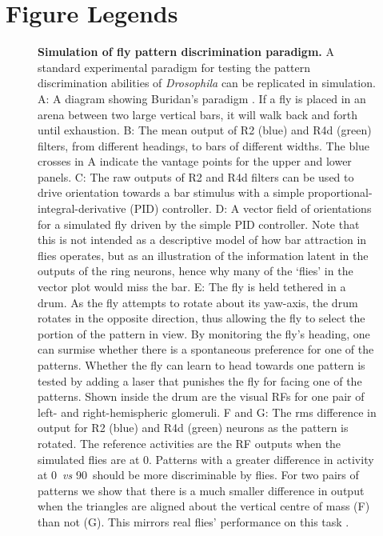 \documentclass[10pt]{article}
\begin{document}
\section*{Figure Legends}
%
\begin{figure}
	\caption{
		{\bf Simulation of fly pattern discrimination paradigm.}
		A standard experimental paradigm for testing the pattern discrimination abilities of \emph{Drosophila} \cite{Ernst1999} can be replicated in simulation.
		A: A diagram showing Buridan's paradigm \protect\cite{Gotz1980,Bulthoff1982}. If a fly is placed in an arena between two large vertical bars, it will walk back and forth until exhaustion.
		B: The mean output of R2 (blue) and R4d (green) filters, from different headings, to bars of different widths. The blue crosses in A indicate the vantage points for the upper and lower panels.
		C: The raw outputs of R2 and R4d filters can be used to drive orientation towards a bar stimulus with a simple
		proportional-integral-derivative (PID) controller.
		D: A vector field of orientations for a simulated fly driven by the simple PID controller.
		Note that this is not intended as a descriptive model of how bar attraction in flies operates, but as an illustration of the information latent in the outputs of the ring neurons, hence why many of the `flies' in the vector plot would miss the bar.
		E: The fly is held tethered in a drum. As the fly attempts to rotate about its yaw-axis, the drum rotates in the opposite direction, thus allowing the fly to select the portion of the pattern in view.
		By monitoring the fly's heading, one can surmise whether there is a spontaneous preference for one of the patterns.
		Whether the fly can learn to head towards one pattern is tested by adding a laser that punishes the fly for facing one of the patterns.
		Shown inside the drum are the visual \acp{RF} for one pair of left- and right-hemispheric glomeruli.
		F and G: The \ac{rms} difference in output for R2 (blue) and R4d (green) neurons as the pattern is rotated.
		The reference activities are the \ac{RF} outputs when the simulated flies are at 0\degree.
		Patterns with a greater difference in activity at 0\degree\ \emph{vs} 90\degree\ should be more discriminable by flies.
		For two pairs of patterns we show that there is a much smaller difference in output when the triangles are aligned about the vertical centre of mass (F) than not (G).
		This mirrors real flies' performance on this task \cite{Ernst1999}.
	}
	\label{fig:recap}
\end{figure}
\end{document}
